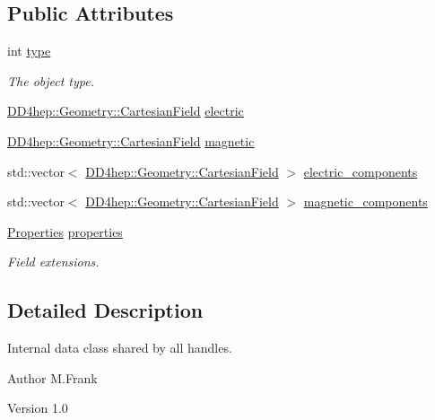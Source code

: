 \subsection*{Public Attributes}
\begin{DoxyCompactItemize}
\item 
int \hyperlink{class_d_d4hep_1_1_geometry_1_1_overlayed_field_1_1_object_a9cf611593f516274f139d0524d8480de}{type}
\begin{DoxyCompactList}\small\item\em The object type. \item\end{DoxyCompactList}\item 
\hyperlink{class_d_d4hep_1_1_geometry_1_1_cartesian_field}{DD4hep::Geometry::CartesianField} \hyperlink{class_d_d4hep_1_1_geometry_1_1_overlayed_field_1_1_object_a3bdf6ca218ef224725fa0a28e050c1a1}{electric}
\item 
\hyperlink{class_d_d4hep_1_1_geometry_1_1_cartesian_field}{DD4hep::Geometry::CartesianField} \hyperlink{class_d_d4hep_1_1_geometry_1_1_overlayed_field_1_1_object_ad7154abfd06456e5530e93b29c2bab40}{magnetic}
\item 
std::vector$<$ \hyperlink{class_d_d4hep_1_1_geometry_1_1_cartesian_field}{DD4hep::Geometry::CartesianField} $>$ \hyperlink{class_d_d4hep_1_1_geometry_1_1_overlayed_field_1_1_object_aae39088c562716b2948e205cebb2c8b4}{electric\_\-components}
\item 
std::vector$<$ \hyperlink{class_d_d4hep_1_1_geometry_1_1_cartesian_field}{DD4hep::Geometry::CartesianField} $>$ \hyperlink{class_d_d4hep_1_1_geometry_1_1_overlayed_field_1_1_object_ab56126a85338942dfac10260834e88a4}{magnetic\_\-components}
\item 
\hyperlink{class_d_d4hep_1_1_geometry_1_1_overlayed_field_acdf81fbf8e0c336cb724ee2846a2c5b0}{Properties} \hyperlink{class_d_d4hep_1_1_geometry_1_1_overlayed_field_1_1_object_a184fdde08ca58abba25c3fbe812e21bc}{properties}
\begin{DoxyCompactList}\small\item\em Field extensions. \item\end{DoxyCompactList}\end{DoxyCompactItemize}


\subsection{Detailed Description}
Internal data class shared by all handles. \begin{DoxyAuthor}{Author}
M.Frank 
\end{DoxyAuthor}
\begin{DoxyVersion}{Version}
1.0 
\end{DoxyVersion}


